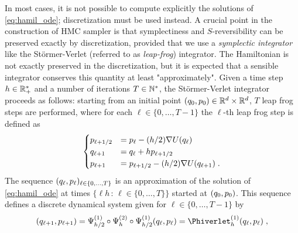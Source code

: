 In most cases, it is not possible to compute explicitly the solutions of \eqref{eq:hamil_ode}; discretization must be used instead.
 A crucial point in the construction of HMC sampler is that  symplectiness and $S$-reversibility can be preserved exactly by discretization, provided that we use a \emph{symplectic integrator} like the Störmer-Verlet (referred to as \emph{leap-frog}) integrator. The Hamiltonian is not exactly preserved in the discretization, but it is expected that a sensible integrator conserves this quantity at least "approximately".
 Given a time step $h \in \mathbb{R}^*_+$ and a number of iterations $T \in \mathbb{N}^*$, the Störmer-Verlet integrator proceeds as follows: starting from an initial point $(q_0,p_0) \in
\mathbb{R}^d \times \mathbb{R}^d$, $T$ leap frog steps are performed, where for each $\ell \in \{0,\dots,T-1\}$ the $\ell$-th leap frog step is defined as
\begin{equation}
\label{eq:iteration_verlet}
  \begin{cases}
p_{\ell+1/2} &= p_\ell - (h/2) \nabla U(q_\ell)\\
q_{\ell+1} &= q_\ell +hp_{\ell+1/2}\\
p_{\ell+1} &= p_{\ell+1/2}-(h/2) \nabla U(q_{\ell+1}) \;.
  \end{cases}
\end{equation}
The sequence $(q_\ell,p_\ell)_{\ell \in \{0,\dots,T\}}$ is an
approximation of the solution of \eqref{eq:hamil_ode} at times $\{\ell h
\, : \, \ell \in \{0,\ldots, T\}\}$ started at $(q_0,p_0)$. This sequence defines a discrete dynamical system given for $\ell \in \{0,\ldots,T-1\}$ by
\begin{equation}
  (\q_{\ell+1},\p_{\ell+1}) =  \Psiverlet^{(1)}_{h/2} \circ \Psiverlet^{(2)}_h \circ \Psiverlet^{(1)}_{h/2} (\q_\ell,\p_\ell) = \Phiverlet^{(1)}_h(\q_\ell,\p_\ell) \eqsp,
\end{equation}

